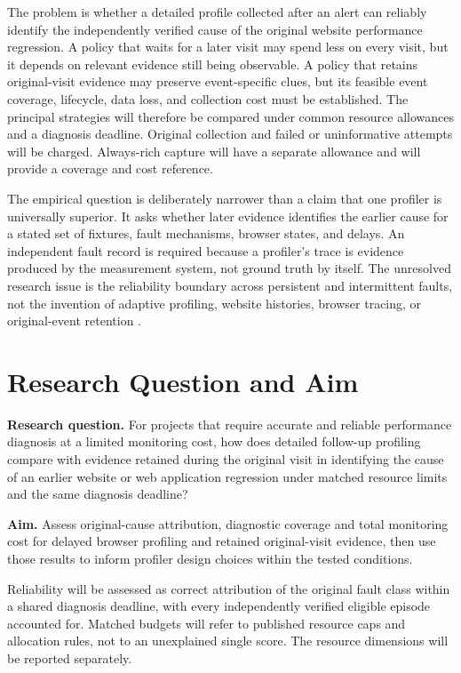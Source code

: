 The problem is whether a detailed profile collected after an alert can reliably identify the independently verified cause of the original website performance regression. A policy that waits for a later visit may spend less on every visit, but it depends on relevant evidence still being observable. A policy that retains original-visit evidence may preserve event-specific clues, but its feasible event coverage, lifecycle, data loss, and collection cost must be established. The principal strategies will therefore be compared under common resource allowances and a diagnosis deadline. Original collection and failed or uninformative attempts will be charged. Always-rich capture will have a separate allowance and will provide a coverage and cost reference.

The empirical question is deliberately narrower than a claim that one profiler is universally superior. It asks whether later evidence identifies the earlier cause for a stated set of fixtures, fault mechanisms, browser states, and delays. An independent fault record is required because a profiler's trace is evidence produced by the measurement system, not ground truth by itself. The unresolved research issue is the reliability boundary across persistent and intermittent faults, not the invention of adaptive profiling, website histories, browser tracing, or original-event retention \parencite{TIIDVPV8,P57ARGS6,ZZSL9IPU,3ED3FDXH}.

\section{Research Question and Aim}

\textbf{Research question.} For projects that require accurate and reliable performance diagnosis at a limited monitoring cost, how does detailed follow-up profiling compare with evidence retained during the original visit in identifying the cause of an earlier website or web application regression under matched resource limits and the same diagnosis deadline?

\textbf{Aim.} Assess original-cause attribution, diagnostic coverage and total monitoring cost for delayed browser profiling and retained original-visit evidence, then use those results to inform profiler design choices within the tested conditions.

Reliability will be assessed as correct attribution of the original fault class within a shared diagnosis deadline, with every independently verified eligible episode accounted for. Matched budgets will refer to published resource caps and allocation rules, not to an unexplained single score. The resource dimensions will be reported separately.

